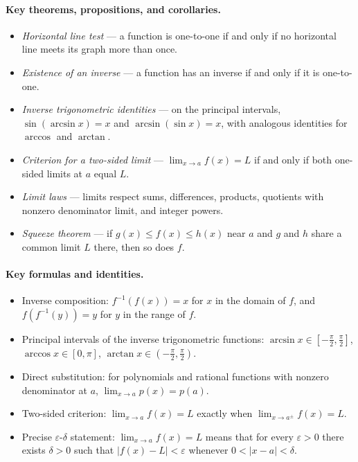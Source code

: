 \paragraph{Key theorems, propositions, and corollaries.}
\begin{itemize}
    \item \emph{Horizontal line test} --- a function is one-to-one if and only if no horizontal line meets its graph more than once.
    \item \emph{Existence of an inverse} --- a function has an inverse if and only if it is one-to-one.
    \item \emph{Inverse trigonometric identities} --- on the principal intervals, \(\sin(\arcsin x) = x\) and \(\arcsin(\sin x) = x\), with analogous identities for \(\arccos\) and \(\arctan\).
    \item \emph{Criterion for a two-sided limit} --- \(\lim_{x \to a} f(x) = L\) if and only if both one-sided limits at \(a\) equal \(L\).
    \item \emph{Limit laws} --- limits respect sums, differences, products, quotients with nonzero denominator limit, and integer powers.
    \item \emph{Squeeze theorem} --- if \(g(x) \le f(x) \le h(x)\) near \(a\) and \(g\) and \(h\) share a common limit \(L\) there, then so does \(f\).
\end{itemize}

\paragraph{Key formulas and identities.}
\begin{itemize}
    \item Inverse composition: \(f^{-1}(f(x)) = x\) for \(x\) in the domain of \(f\), and \(f(f^{-1}(y)) = y\) for \(y\) in the range of \(f\).
    \item Principal intervals of the inverse trigonometric functions: \(\arcsin x \in \left[-\tfrac{\pi}{2}, \tfrac{\pi}{2}\right]\), \(\arccos x \in [0, \pi]\), \(\arctan x \in \left(-\tfrac{\pi}{2}, \tfrac{\pi}{2}\right)\).
    \item Direct substitution: for polynomials and rational functions with nonzero denominator at \(a\), \(\lim_{x \to a} p(x) = p(a)\).
    \item Two-sided criterion: \(\lim_{x \to a} f(x) = L\) exactly when \(\lim_{x \to a^{\pm}} f(x) = L\).
    \item Precise \(\varepsilon\)-\(\delta\) statement: \(\lim_{x \to a} f(x) = L\) means that for every \(\varepsilon > 0\) there exists \(\delta > 0\) such that \(|f(x) - L| < \varepsilon\) whenever \(0 < |x - a| < \delta\).
\end{itemize}
